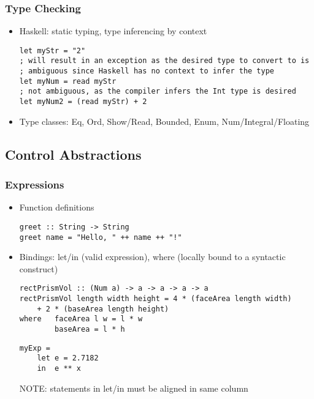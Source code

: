 \documentclass[titlepage,12pt]{article}
\newcommand{\bi}{\begin{itemize}}
\newcommand{\ei}{\end{itemize}}
\begin{document}
\subsubsection{Type Checking}
\bi
    \item Haskell: static typing, type inferencing by context
\begin{verbatim}
let myStr = "2"
; will result in an exception as the desired type to convert to is
; ambiguous since Haskell has no context to infer the type
let myNum = read myStr
; not ambiguous, as the compiler infers the Int type is desired
let myNum2 = (read myStr) + 2
\end{verbatim}
    \item Type classes: Eq, Ord, Show/Read, Bounded, Enum, Num/Integral/Floating
\ei

\subsection{Control Abstractions}
\subsubsection{Expressions}
\bi
    \item Function definitions
\begin{verbatim}
greet :: String -> String
greet name = "Hello, " ++ name ++ "!"
\end{verbatim}
    \item Bindings: let/in (valid expression), where (locally bound to a syntactic construct)
\begin{verbatim}
rectPrismVol :: (Num a) -> a -> a -> a -> a
rectPrismVol length width height = 4 * (faceArea length width)
    + 2 * (baseArea length height)
where   faceArea l w = l * w
        baseArea = l * h
\end{verbatim}
\begin{verbatim}
myExp =
    let e = 2.7182
    in  e ** x
\end{verbatim}
NOTE: statements in let/in must be aligned in same column
\ei
\end{document}
